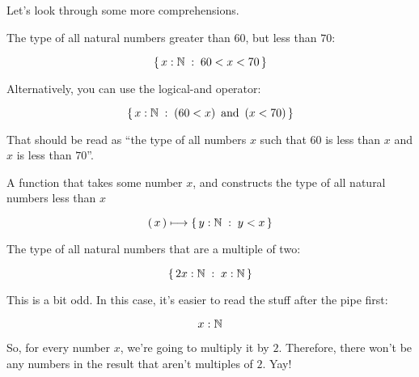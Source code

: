 
Let's look through some more comprehensions.

\begin{example}
    The type of all natural numbers greater than $60$, but less than $70$:

    \begin{equation}
        \left\{\, x : \mathbb{N}\; : \; 60 < x < 70 \,\right\}
    \end{equation}

    Alternatively, you can use the logical-and operator:

    \begin{equation}
        \left\{\, x : \mathbb{N}\; : \; \left( 60 < x \right) \text{ and } \left( x < 70 \right) \,\right\}
    \end{equation}

    That should be read as ``the type of all numbers $x$ such that $60$ is less
    than $x$ and $x$ is less than $70$''.
\end{example}

\begin{example}
    A function that takes some number $x$, and constructs the type of all
    natural numbers less than $x$

    \begin{equation}
        \left(\, x \,\right) \longmapsto \left\{\, y : \mathbb{N}\; : \; y < x \,\right\}
    \end{equation}
\end{example}

\begin{example}
    The type of all natural numbers that are a multiple of two:

    \begin{equation}
        \left\{\, 2x : \mathbb{N}\; : \; x : \mathbb{N} \,\right\}
    \end{equation}

    This is a bit odd. In this case, it's easier to read the stuff after the
    pipe first:

    \begin{equation}
        x : \mathbb{N}
    \end{equation}

    So, for every number $x$, we're going to multiply it by $2$. Therefore,
    there won't be any numbers in the result that aren't multiples of $2$. Yay!
\end{example}

